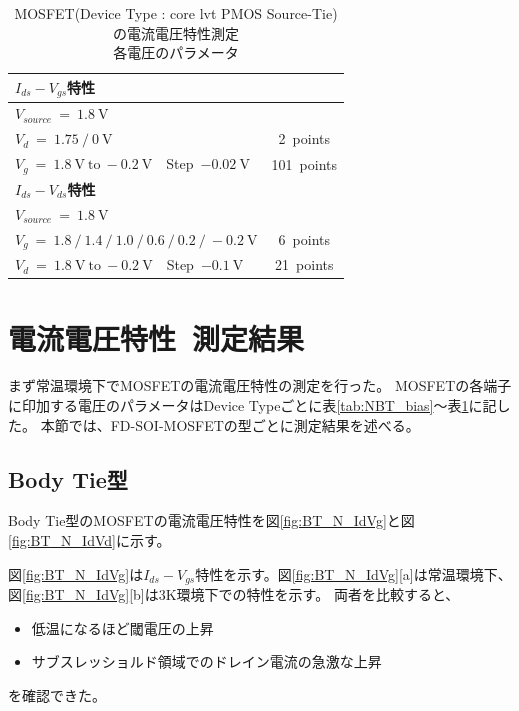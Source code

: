 			\begin{table}[htb]
				\begin{center}
					\begin{tabular}{| l c |} \hline \hline
						{\bf $I_{ds}-V_{gs}$特性} & \ \\ \hline
						$V_{source}\ =\ 1.8\ \mathrm{V}$ & \ \\
						$V_{d}\ =\ 1.75\ /\ 0\ \mathrm{V}$ & 2\ points \\
						$V_{g}\ =\ 1.8\ \mathrm{V}\ \mathrm{to}\ -0.2\ \mathrm{V}$\ \ Step\ $-0.02\ \mathrm{V}$ & 101\ points \\ \hline \hline
						{\bf $I_{ds}-V_{ds}$特性} & \ \\ \hline
						$V_{source}\ =\ 1.8\ \mathrm{V}$ & \ \\
						$V_{g}\ =\ 1.8\ /\ 1.4\ /\ 1.0\ /\ 0.6\ /\ 0.2\ /\ -0.2\ \mathrm{V}$ & 6\ points \\
						$V_{d}\ =\ 1.8\ \mathrm{V}\ \mathrm{to}\ -0.2\ \mathrm{V}$\ \ Step\ $-0.1\ \mathrm{V}$ & 21\ points \\ \hline
					\end{tabular}
					\caption{MOSFET(Device Type : core lvt PMOS Source-Tie)の電流電圧特性測定\\各電圧のパラメータ}
					\label{tab:PST_bias}
				\end{center}
			\end{table}
			\clearpage 

	\section{電流電圧特性\ 測定結果}
		まず常温環境下でMOSFETの電流電圧特性の測定を行った。
		MOSFETの各端子に印加する電圧のパラメータはDevice Typeごとに表\ref{tab:NBT_bias}〜表\ref{tab:PST_bias}に記した。
		本節では、FD-SOI-MOSFETの型ごとに測定結果を述べる。
		\subsection{Body Tie型}
			Body Tie型のMOSFETの電流電圧特性を図\ref{fig:BT_N_IdVg}と図\ref{fig:BT_N_IdVd}に示す。
			
			図\ref{fig:BT_N_IdVg}は$I_{ds}-V_{gs}$特性を示す。図\ref{fig:BT_N_IdVg}[a]は常温環境下、図\ref{fig:BT_N_IdVg}[b]は3K環境下での特性を示す。
			両者を比較すると、
			\begin{itemize}
				\item 低温になるほど閾電圧の上昇
				\item サブスレッショルド領域でのドレイン電流の急激な上昇
			\end{itemize}
			を確認できた。
			
